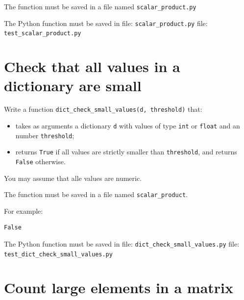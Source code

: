 The function must be saved in a file named \texttt{scalar\_product.py}

The Python function must be saved in file: \texttt{scalar\_product.py}
\Test file: \texttt{test\_scalar\_product.py}

\pagebreak

\section{Check that all values in a dictionary are
small}\label{check-that-all-values-in-a-dictionary-are-small}

Write a function \texttt{dict\_check\_small\_values(d,\ threshold)}
that:

\begin{itemize}
\tightlist
\item
  takes as arguments a dictionary \texttt{d} with values of type
  \texttt{int} or \texttt{float} and an number \texttt{threshold};
\item
  returns \texttt{True} if all values are strictly smaller than
  \texttt{threshold}, and returns \texttt{False} otherwise.
\end{itemize}

You may assume that alle values are numeric.

The function must be saved in a file named \texttt{scalar\_product}.

For example:

\begin{Shaded}
\begin{Highlighting}[]
\OperatorTok{=}\NormalTok{ \{}\NormalTok{: }\NormalTok{, }\NormalTok{ : }\NormalTok{, }\NormalTok{: }\NormalTok{\}}

\NormalTok{))}
\end{Highlighting}
\end{Shaded}

\begin{verbatim}
False
\end{verbatim}

The Python function must be saved in file:
\texttt{dict\_check\_small\_values.py} \Test file:
\texttt{test\_dict\_check\_small\_values.py}

\pagebreak

\section{Count large elements in a
matrix}\label{count-large-elements-in-a-matrix}

